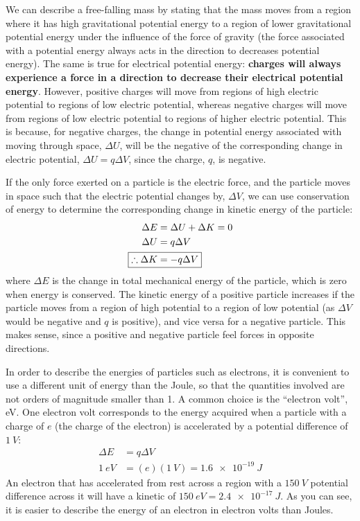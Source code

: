 We can describe a free-falling mass by stating that the mass moves from a region where it has high gravitational potential energy to a region of lower gravitational potential energy under the influence of the force of gravity (the force associated with a potential energy always acts in the direction to decreases potential energy). The same is true for electrical potential energy: \textbf{charges will always experience a force in a direction to decrease their electrical potential energy}. However, positive charges will move from regions of high electric potential to regions of low electric potential, whereas negative charges will move from regions of low electric potential to regions of higher electric potential. This is because, for negative charges, the change in potential energy associated with moving through space, $\Delta U$, will be the negative of the corresponding change in electric potential, $\Delta U=q\Delta V$, since the charge, $q$, is negative. 


If the only force exerted on a particle is the electric force, and the particle moves in space such that the electric potential changes by, $\Delta V$, we can use conservation of energy to determine the corresponding change in kinetic energy of the particle:
\begin{align*}
\Delta E &= \Delta U + \Delta K = 0\\
\Delta U &= q\Delta V\\
\Aboxed{\therefore \Delta K &= -q \Delta V}
\end{align*}
where $\Delta E$ is the change in total mechanical energy of the particle, which is zero when energy is conserved. The kinetic energy of a positive particle increases if the particle moves from a region of high potential to a region of low potential (as $\Delta V$ would be negative and $q$ is positive), and vice versa for a negative particle. This makes sense, since a positive and negative particle feel forces in opposite directions.

In order to describe the energies of particles such as electrons, it is convenient to use a different unit of energy than the Joule, so that the quantities involved are not orders of magnitude smaller than 1. A common choice is the ``electron volt'', \si{eV}. One electron volt corresponds to the energy acquired when a particle with a charge of $e$ (the charge of the electron) is accelerated by a potential difference of $\SI{1}{V}$:
\begin{align*}
\Delta E &= q\Delta V\\
\SI{1}{eV}&=(e)(\SI{1}{V})=\SI{1.6e-19}{J}
\end{align*}
An electron that has accelerated from rest across a region with a $\SI{150}{V}$ potential difference across it will have a kinetic of $\SI{150}{eV}=\SI{2.4e-17}{J}$. As you can see, it is easier to describe the energy of an electron in electron volts than Joules.

